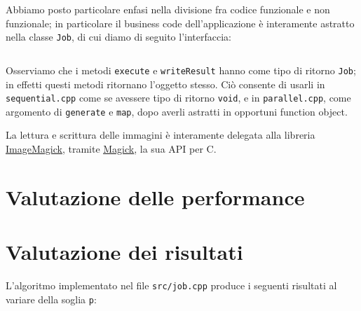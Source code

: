 \documentclass[10pt]{article}
\newcommand{\cpp}{C\nolinebreak\hspace{-.05em}\raisebox{.4ex}{\tiny\bf +}\nolinebreak\hspace{-.10em}\raisebox{.4ex}{\tiny\bf +}}
\newcommand{\mpp}{Magick\nolinebreak\hspace{-.05em}\raisebox{.4ex}{\tiny\bf +}\nolinebreak\hspace{-.10em}\raisebox{.4ex}{\tiny\bf +}}
\begin{document}
    Abbiamo posto particolare enfasi nella divisione fra codice funzionale e
    non funzionale; in particolare il business code dell'applicazione è
    interamente astratto nella classe \texttt{Job}, di cui diamo di seguito
    l'interfaccia:

    \inputminted[]{c++}{src/job.h}

    Osserviamo che i metodi \texttt{execute} e \texttt{writeResult} hanno
    come tipo di ritorno \texttt{Job}; in effetti questi metodi ritornano
    l'oggetto stesso. Ciò consente di usarli in \texttt{sequential.cpp} come
    se avessere tipo di ritorno \texttt{void}, e in \texttt{parallel.cpp},
    come argomento di \texttt{generate} e \texttt{map}, dopo averli astratti 
    in opportuni function object.

    La lettura e scrittura delle immagini è interamente delegata alla
    libreria \href{http://www.imagemagick.org/script/index.php}{\underline{ImageMagick}},
    tramite \href{http://www.imagemagick.org/script/magick++.php}{\underline{\mpp}},
    la sua API per \cpp.

    \section{Valutazione delle performance}

    \section{Valutazione dei risultati}

    L'algoritmo implementato nel file \texttt{src/job.cpp} produce i
    seguenti risultati al variare della soglia \texttt{p}:
\end{document}
